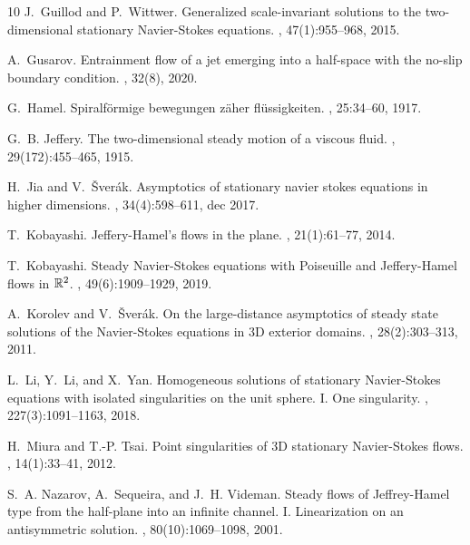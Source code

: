 \documentclass[reqno,12pt]{amsart}
\begin{document}
\begin{thebibliography}{10}
	J.~Guillod and P.~Wittwer.
	\newblock Generalized scale-invariant solutions to the two-dimensional
	stationary {N}avier-{S}tokes equations.
	, 47(1):955--968, 2015.
	
	A.~Gusarov.
	\newblock Entrainment flow of a jet emerging into a half-space with the no-slip
	boundary condition.
	, 32(8), 2020.
	
	G.~Hamel.
	\newblock Spiralf{\"o}rmige bewegungen z{\"a}her fl{\"u}ssigkeiten.
	,
	25:34--60, 1917.
	
	G.~B. Jeffery.
	\newblock The two-dimensional steady motion of a viscous fluid.
	, 29(172):455--465, 1915.
	
	H.~Jia and V.~{\v{S}}ver{\'{a}}k.
	\newblock Asymptotics of stationary navier stokes equations in higher
	dimensions.
	, 34(4):598--611, dec
	2017.
	
	T.~Kobayashi.
	\newblock Jeffery-{H}amel's flows in the plane.
	, 21(1):61--77, 2014.
	
	T.~Kobayashi.
	\newblock Steady {N}avier-{S}tokes equations with {P}oiseuille and
	{J}effery-{H}amel flows in {$\Bbb R^2$}.
	, 49(6):1909--1929, 2019.
	
	A.~Korolev and V.~\v{S}ver\'{a}k.
	\newblock On the large-distance asymptotics of steady state solutions of the
	{N}avier-{S}tokes equations in 3{D} exterior domains.
	,
	28(2):303--313, 2011.
	
	L.~Li, Y.~Li, and X.~Yan.
	\newblock Homogeneous solutions of stationary {N}avier-{S}tokes equations with
	isolated singularities on the unit sphere. {I}. {O}ne singularity.
	, 227(3):1091--1163, 2018.
	
	H.~Miura and T.-P. Tsai.
	\newblock Point singularities of 3{D} stationary {N}avier-{S}tokes flows.
	, 14(1):33--41, 2012.
	
	S.~A. Nazarov, A.~Sequeira, and J.~H. Videman.
	\newblock Steady flows of {J}effrey-{H}amel type from the half-plane into an
	infinite channel. {I}. {L}inearization on an antisymmetric solution.
	, 80(10):1069--1098, 2001.
	

\end{thebibliography}
\end{document}
